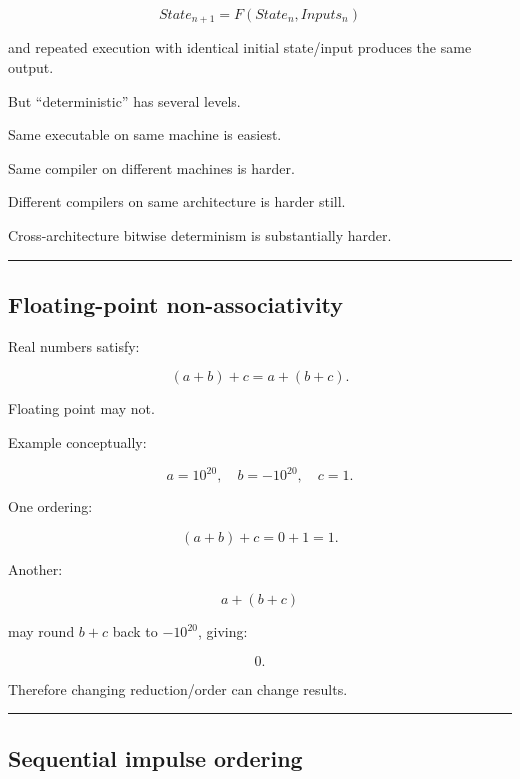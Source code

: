 \[
\boxed{
State_{n+1}
=
F(State_n,Inputs_n)
}
\]

and repeated execution with identical initial state/input produces the same output.

But ``deterministic'' has several levels.

Same executable on same machine is easiest.

Same compiler on different machines is harder.

Different compilers on same architecture is harder still.

Cross-architecture bitwise determinism is substantially harder.

\begin{center}\rule{0.5\linewidth}{0.5pt}\end{center}

\subsection{Floating-point non-associativity}\label{06-engine-ii-ch039-floating-point-non-associativity}

\hypertarget{06-engine-ii-ch039-floating-point-non-associativity}{}

Real numbers satisfy:

\[
(a+b)+c
=
a+(b+c).
\]

Floating point may not.

Example conceptually:

\[
a=10^{20},
\quad
b=-10^{20},
\quad
c=1.
\]

One ordering:

\[
(a+b)+c
=
0+1
=
1.
\]

Another:

\[
a+(b+c)
\]

may round \(b+c\) back to \(-10^{20}\), giving:

\[
0.
\]

Therefore changing reduction/order can change results.

\begin{center}\rule{0.5\linewidth}{0.5pt}\end{center}

\subsection{Sequential impulse ordering}\label{06-engine-ii-ch039-sequential-impulse-ordering}

\hypertarget{06-engine-ii-ch039-sequential-impulse-ordering}{}

